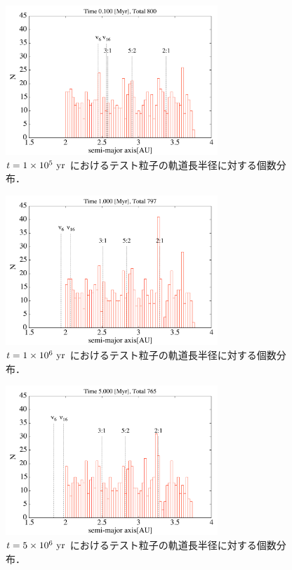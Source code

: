 \documentclass[11pt,a4paper,oneside,onecolumn]{jreport}
\begin{document}
\begin{figure}[H]
\centering
\includegraphics[width=8cm]{./image/asteroid_histogram_100kyr.pdf}
\caption{$t = 1 \times 10^5\ {\rm yr}$ におけるテスト粒子の軌道長半径に対する個数分布．\label{fig:asteroid_histogram_100kyr}}
\end{figure}

\begin{figure}[H]
\centering
\includegraphics[width=8cm]{./image/asteroid_histogram_1Myr.pdf}
\caption{$t = 1 \times 10^6\ {\rm yr}$ におけるテスト粒子の軌道長半径に対する個数分布．\label{fig:asteroid_histogram_1Myr}}
\end{figure}

\begin{figure}[H]
\centering
\includegraphics[width=8cm]{./image/asteroid_histogram_5Myr.pdf}
\caption{$t = 5 \times 10^6\ {\rm yr}$ におけるテスト粒子の軌道長半径に対する個数分布．\label{fig:asteroid_histogram_5Myr}}
\end{figure}
\end{document}
